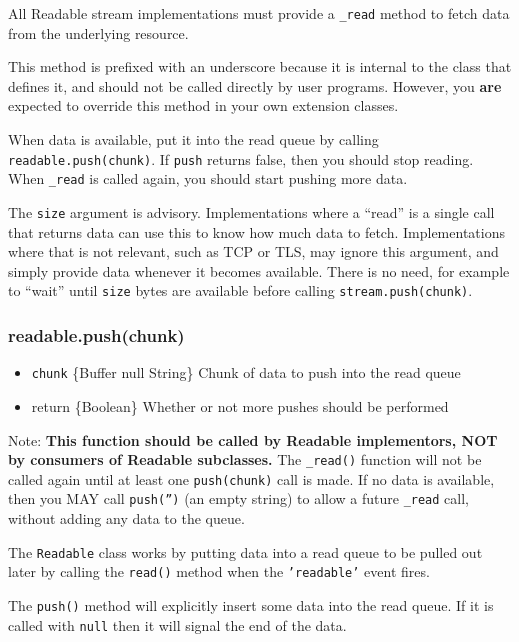 All Readable stream implementations must provide a \texttt{\_read}
method to fetch data from the underlying resource.

This method is prefixed with an underscore because it is internal to the
class that defines it, and should not be called directly by user
programs. However, you \textbf{are} expected to override this method in
your own extension classes.

When data is available, put it into the read queue by calling
\texttt{readable.push(chunk)}. If \texttt{push} returns false, then you
should stop reading. When \texttt{\_read} is called again, you should
start pushing more data.

The \texttt{size} argument is advisory. Implementations where a ``read''
is a single call that returns data can use this to know how much data to
fetch. Implementations where that is not relevant, such as TCP or TLS,
may ignore this argument, and simply provide data whenever it becomes
available. There is no need, for example to ``wait'' until \texttt{size}
bytes are available before calling \texttt{stream.push(chunk)}.

\subsubsection{readable.push(chunk)}

\begin{itemize}
\item
  \texttt{chunk} \{Buffer \textbar{} null \textbar{} String\} Chunk of
  data to push into the read queue
\item
  return \{Boolean\} Whether or not more pushes should be performed
\end{itemize}

Note: \textbf{This function should be called by Readable implementors,
NOT by consumers of Readable subclasses.} The \texttt{\_read()} function
will not be called again until at least one \texttt{push(chunk)} call is
made. If no data is available, then you MAY call \texttt{push('')} (an
empty string) to allow a future \texttt{\_read} call, without adding any
data to the queue.

The \texttt{Readable} class works by putting data into a read queue to
be pulled out later by calling the \texttt{read()} method when the
\texttt{'readable'} event fires.

The \texttt{push()} method will explicitly insert some data into the
read queue. If it is called with \texttt{null} then it will signal the
end of the data.

